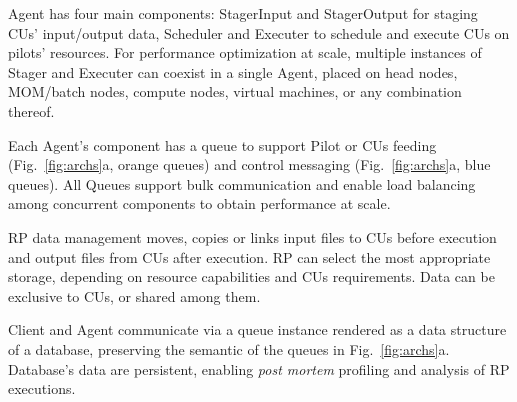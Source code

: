 \documentclass[preprint,12pt, a4paper]{elsarticle}
\begin{document}
Agent has four main components: StagerInput and StagerOutput for staging CUs'
input/output data, Scheduler and Executer to schedule and execute CUs on
pilots' resources. For performance optimization at scale, multiple instances
of Stager and Executer can coexist in a single Agent, placed on head nodes,
MOM/batch nodes, compute nodes, virtual machines, or any combination thereof.


Each Agent's component has a queue to support Pilot or CUs feeding
(Fig.~\ref{fig:archs}a, orange queues) and control messaging
(Fig.~\ref{fig:archs}a, blue queues). All Queues support bulk communication
and enable load balancing among concurrent components to obtain performance
at scale.


RP data management moves, copies or links input files to CUs before execution
and output files from CUs after execution. RP can select the most appropriate
storage, depending on resource capabilities and CUs requirements.  Data can
be exclusive to CUs, or shared among them.


Client and Agent communicate via a queue instance rendered as a data
structure of a database, preserving the semantic of the queues in
Fig.~\ref{fig:archs}a. Database's data are persistent, enabling \textit{post
mortem} profiling and analysis of RP executions.
\end{document}
